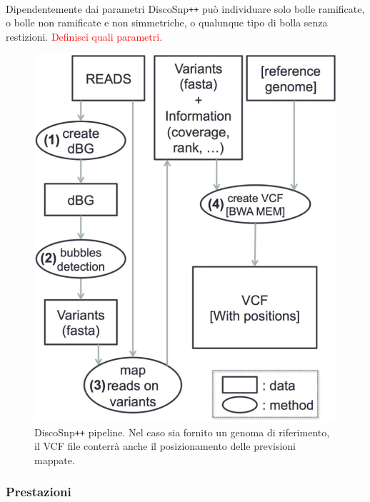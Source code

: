 \documentclass[../main.tex]{subfiles}
\begin{document}
\noindent
\\
Dipendentemente dai parametri DiscoSnp\texttt{++} può individuare solo bolle ramificate, o bolle non ramificate e non simmetriche, o qualunque tipo di bolla senza restizioni. \textcolor{red}{Definisci quali parametri.}

\begin{figure}[h]
	\centering
  	\captionsetup{justification=centering}
  	\includegraphics[scale=.90]{images/discosnp_pipeline.jpg}
  	\caption{DiscoSnp\texttt{++} pipeline. Nel caso sia fornito un genoma di riferimento, il VCF file conterrà anche il posizionamento delle previsioni mappate.}
  	\label{fig:pipe1}
\end{figure}

\subsubsection{Prestazioni}
\end{document}
